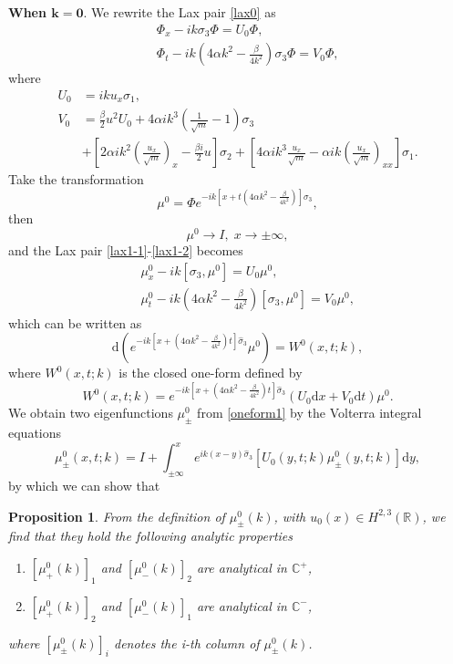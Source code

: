 \documentclass[11pt]{article}
\numberwithin{equation}{section}
\newtheorem{Proposition}{Proposition}
\begin{document}
\noindent\textbf{When $\mathbf{k=0}.$}  We rewrite  the Lax pair \eqref{lax0} as
\begin{eqnarray}
   &&\Phi_x-ik\sigma_3\Phi=U_0\Phi\label{lax1-1},\\
   &&\Phi_t-ik\left(4\alpha k^2-\frac{\beta}{4k^2}\right)\sigma_3\Phi=V_0\Phi,\label{lax1-2}
\end{eqnarray}
where
\begin{align*}
    U_0&=iku_x\sigma_1,\\
    V_0&=\frac{\beta}{2}u^2U_0+4\alpha ik^3\left(\frac{1}{\sqrt{m}}-1\right)\sigma_3\\
    &+\left[2\alpha ik^2\left(\frac{u_x}{\sqrt{m}}\right)_x-\frac{\beta i}{2}u\right]\sigma_2+\left[4\alpha ik^3\frac{u_x}{\sqrt{m}}-\alpha ik\left(\frac{u_x}{\sqrt{m}}\right)_{xx}\right]\sigma_1.
\end{align*}
Take the transformation
\begin{equation}
    \mu^0=\Phi e^{-ik\left[x+t\left(4\alpha k^2-\frac{\beta}{4k^2}\right)\right]\sigma_3},
\end{equation}
then
$$\mu^0 \to I,\;x\to\pm\infty,$$ and the Lax pair \eqref{lax1-1}-\eqref{lax1-2} becomes
\begin{eqnarray}
    &&\mu^0_x-ik\left[\sigma_3,\mu^0\right]=U_0\mu^0,\label{lax1-3}\\
    &&\mu^0_t-ik\left(4\alpha k^2-\frac{\beta}{4k^2}\right)\left[\sigma_3,\mu^0\right]=V_0\mu^0,\label{lax1-4}
\end{eqnarray}
which  can be written as
\begin{equation}
    \mathrm{d}\left(e^{-ik[x+(4\alpha k^2-\frac{\beta}{4k^2})t]\hat{\sigma}_3}\mu^0\right)=W^0(x,t;k),\label{oneform1}
\end{equation}
where $W^0(x,t;k)$ is the closed one-form defined by
\begin{equation}
    W^0(x,t;k)=e^{-ik[x+(4\alpha k^2-\frac{\beta}{4k^2})t]\hat{\sigma}_3}\left(U_0\mathrm{d}x+V_0\mathrm{d}t\right)\mu^0.
\end{equation}
We obtain  two eigenfunctions $\mu_{\pm}^0 $ from  \eqref{oneform1} by the Volterra integral equations
\begin{equation}
\mu_{\pm}^0(x,t;k)=I+\int_{\pm\infty}^xe^{ik(x-y)\hat{\sigma}_3}\left[U_0(y,t;k)\mu_{\pm}^0(y,t;k)\right]\mathrm{d}y,
\end{equation}
by  which we can show that
\begin{Proposition}\label{p1}
    From the definition of $\mu^0_{\pm}(k)$, with $u_0(x)\in H^{2,3}(\mathbb{R})$, we find that they hold the following analytic properties
    \begin{enumerate}
    [label=\textnormal{(\arabic*)}]
        \item $\left[\mu_{+}^0(k)\right]_1$ and $\left[\mu_{-}^0(k)\right]_2$ are analytical in $\mathbb{C}^+$,
        \item $\left[\mu_{+}^0(k)\right]_2$ and $\left[\mu_{-}^0(k)\right]_1$ are analytical in $\mathbb{C}^-$,
    \end{enumerate}
    where $\left[\mu^0_{\pm}(k)\right]_i$ denotes the i-th column of $\mu^0_{\pm}(k)$.
\end{Proposition}
\end{document}
